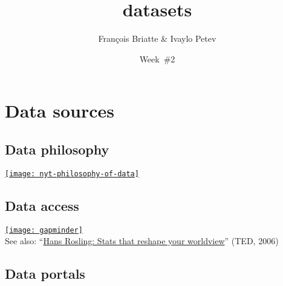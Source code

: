 \documentclass[t]{beamer}
\title{datasets}
\author{François Briatte \& Ivaylo Petev}
\date{Week~\#2}
\begin{document}

  \section{Data sources}

  \subsection{Data philosophy}
  
  \begin{frame}[c, plain]
  
		\href{http://nyti.ms/XSZMFX}%
			{\texttt{[image: nyt-philosophy-of-data]}}	

  \end{frame}    

  \subsection{Data access}
	
	\begin{frame}[c, plain]

		\begin{center}
			\href{http://www.gapminder.org/}%
  			{\texttt{[image: gapminder]}}\\[1em]

			\small{See also: ``\href{http://www.ted.com/talks/hans_rosling_shows_the_best_stats_you_ve_ever_seen.html}{Hans Rosling: Stats that reshape your worldview}'' (TED, 2006)}
		\end{center}
		
	\end{frame}

  \subsection{Data portals}
\end{document}
